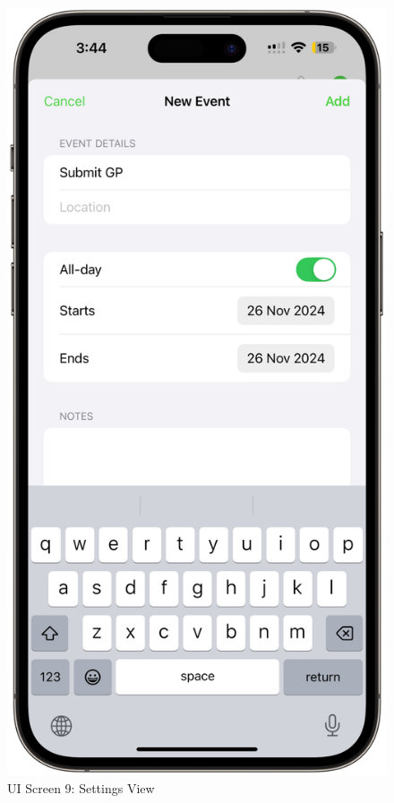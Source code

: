 \begin{figure}[!h]
    \begin{minipage}{0.3\textwidth}
        \centering
        \includegraphics[width=\textwidth]{images/screen9.png}
        \caption{UI Screen 9: Settings View}

\end{minipage}
\end{figure}
